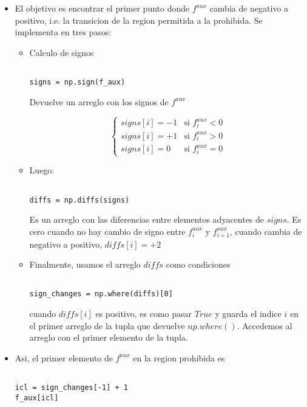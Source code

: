 \documentclass[11pt]{article}
\begin{document}
\begin{itemize}
\begin{verbatim}
\end{verbatim}

\item El objetivo es encontrar el primer punto donde \(f^{aux}\) cambia de negativo a positivo, i.e. la transicion de la region permitida a la prohibida. Se implementa en tres pasos:

\begin{itemize}
\item Calculo de signos

\begin{verbatim}

signs = np.sign(f_aux)

\end{verbatim}

Devuelve un arreglo con los signos de \(f^{aux}\)

\[\begin{cases} signs[i] = -1 & \text{si } f_i^{aux} < 0 \\ signs[i] = +1 & \text{si } f_i^{aux} > 0 \\ signs[i] = 0 & \text{si } f_i^{aux} = 0 \end{cases} \]

\item Luego:

\begin{verbatim}

diffs = np.diffs(signs)

\end{verbatim}

Es un arreglo con las diferencias entre elementos adyacentes de \(signs\). Es cero cuando no hay cambio de signo entre \(f^{aux}_i\) y \(f^{aux}_{i+1}\), cuando cambia de negativo a positivo, \(diffs[i] = +2\)

\item Finalmente, usamos el arreglo \(diffs\) como condiciones

\begin{verbatim}

sign_changes = np.where(diffs)[0]

\end{verbatim}

cuando \(diffs[i]\) es positivo, es como pasar \(True\) y guarda el indice \(i\) en el primer arreglo de la tupla que devuelve \(np.where()\). Accedemos al arreglo con el primer elemento de la tupla.
\end{itemize}

\item Asi, el primer elemento de \(f^{aux}\) en la region prohibida es

\begin{verbatim}

icl = sign_changes[-1] + 1
f_aux[icl]

\end{verbatim}
\end{itemize}
\end{document}
